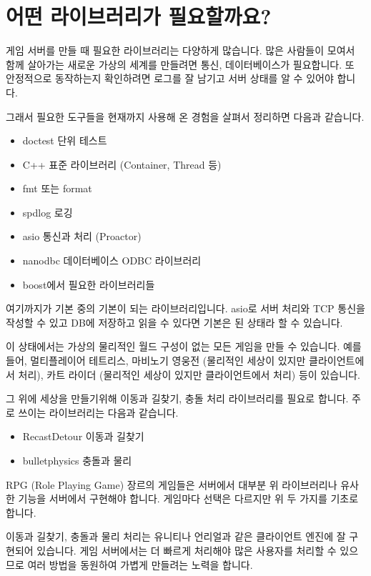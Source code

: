 \chapter{어떤 라이브러리가 필요할까요?}

게임 서버를 만들 때 필요한 라이브러리는 다양하게 많습니다. 많은 사람들이 모여서 
함께 살아가는 새로운 가상의 세계를 만들려면 통신, 데이터베이스가 필요합니다. 또 
안정적으로 동작하는지 확인하려면 로그를 잘 남기고 서버 상태를 알 수 있어야 합니다. 

그래서 필요한 도구들을 현재까지 사용해 온 경험을 살펴서 정리하면 다음과 같습니다. 

\begin{itemize}
    \item doctest 단위 테스트  
    \item C++ 표준 라이브러리 (Container, Thread 등)
    \item fmt 또는 format 
    \item spdlog 로깅  
    \item asio 통신과 처리 (Proactor)
    \item nanodbc 데이터베이스 ODBC 라이브러리 
    \item boost에서 필요한 라이브러리들
\end{itemize}

여기까지가 기본 중의 기본이 되는 라이브러리입니다. asio로 서버 처리와 TCP 통신을 
작성할 수 있고 DB에 저장하고 읽을 수 있다면 기본은 된 상태라 할 수 있습니다. 

이 상태에서는 가상의 물리적인 월드 구성이 없는 모든 게임을 만들 수 있습니다. 예를 들어, 
멀티플레이어 테트리스, 마비노기 영웅전 (물리적인 세상이 있지만 클라이언트에서 처리), 
카트 라이더 (물리적인 세상이 있지만 클라이언트에서 처리) 등이 있습니다. 

그 위에 세상을 만들기위해 이동과 길찾기, 충돌 처리 라이브러리를 필요로 합니다. 
주로 쓰이는 라이브러리는 다음과 같습니다. 

\begin{itemize}
    \item RecastDetour 이동과 길찾기 
    \item bulletphysics 충돌과 물리
\end{itemize}

RPG (Role Playing Game) 장르의 게임들은 서버에서 대부분 위 라이브러리나 유사한 기능을 
서버에서 구현해야 합니다. 게임마다 선택은 다르지만 위 두 가지를 기초로 합니다. 

이동과 길찾기, 충돌과 물리 처리는 유니티나 언리얼과 같은 클라이언트 엔진에 잘 구현되어 
있습니다. 게임 서버에서는 더 빠르게 처리해야 많은 사용자를 처리할 수 있으므로 여러 방법을 
동원하여 가볍게 만들려는 노력을 합니다. 





